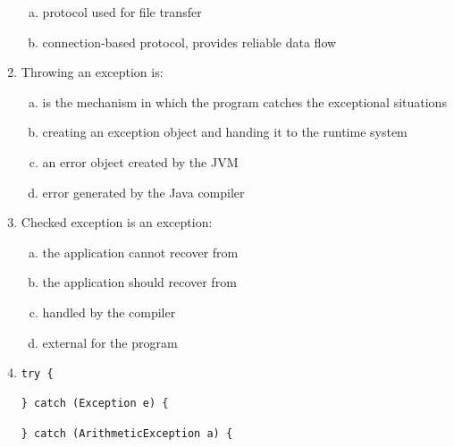 \documentclass[10pt,a4paper,twocolumn]{article}
\begin{document}
\begin{enumerate}
\begin{enumerate}[(a)]
	\item protocol used for file transfer
	\item connection-based protocol, provides reliable data flow
\end{enumerate}
\item Throwing an exception is:
\begin{enumerate}[(a)]
	\item is the mechanism in which the program catches the exceptional situations
	\item creating an exception object and handing it to the runtime system
	\item an error object created by the JVM
	\item error generated by the Java compiler
\end{enumerate}
\item Checked exception is an exception:
\begin{enumerate}[(a)]
	\item the application cannot recover from
	\item the application should recover from
	\item handled by the compiler
	\item external for the program
\end{enumerate}
\item \begin{verbatim}
try {

} catch (Exception e) {
    
} catch (ArithmeticException a) {
    

\end{verbatim}
\end{enumerate}
\end{document}

